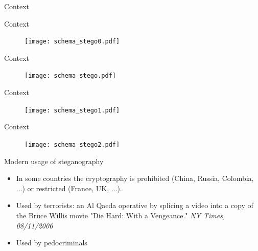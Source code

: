 \documentclass[10pt,aspectratio=169]{beamer}
\begin{document}
\begin{frame}{Context}
\end{frame}


\begin{frame}{Context}
    \begin{figure}[h]
        \texttt{[image: schema\_stego0.pdf]}
    \end{figure}
\end{frame}

\begin{frame}{Context}
    \begin{figure}[h]
        \texttt{[image: schema\_stego.pdf]}
    \end{figure}
\end{frame}

\begin{frame}{Context}
    \begin{figure}[h]
        \texttt{[image: schema\_stego1.pdf]}
    \end{figure}
\end{frame}
    

\begin{frame}{Context}
    \begin{figure}[h]
        \texttt{[image: schema\_stego2.pdf]}
    \end{figure}
    
\end{frame}

\begin{frame}{Modern usage of steganography}
    \begin{itemize}
        \setlength\itemsep{2em}
        \item In some countries the cryptography is prohibited (China, Russia, Colombia, ...) or restricted (France, UK, ...). 
        \item Used by terrorists: an Al Qaeda operative by splicing a video into a copy of the Bruce Willis movie "Die Hard:
        With a Vengeance." \textit{NY Times, 08/11/2006}
        \item Used by pedocriminals
    \end{itemize}
\end{frame}

\end{document}

